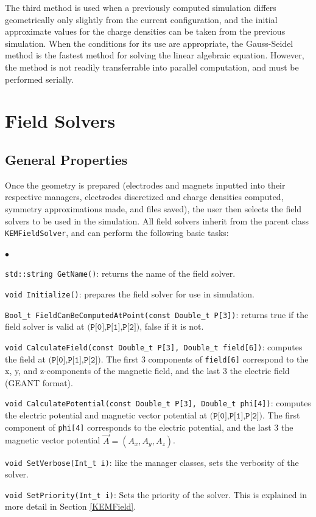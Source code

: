 \documentclass[11pt,a4paper,oneside]{article}
\newcommand{\squishlist}{
   \begin{list}{$\bullet$}
    { \setlength{\itemsep}{0pt}      \setlength{\parsep}{3pt}
      \setlength{\topsep}{3pt}       \setlength{\partopsep}{0pt}
      \setlength{\leftmargin}{1.5em} \setlength{\labelwidth}{1em}
      \setlength{\labelsep}{0.5em} } }
\newcommand{\squishend}{
    \end{list}  }
\begin{document}
The third method is used when a previously computed simulation differs geometrically only slightly from the current configuration, and the initial approximate values for the charge densities can be taken from the previous simulation.  When the conditions for its use are appropriate, the Gauss-Seidel method is the fastest method for solving the linear algebraic equation.  However, the method is not readily transferrable into parallel computation, and must be performed serially.  

\section{Field Solvers}
\label{sec:fieldSolvers}

\subsection{General Properties}
\label{subsec:generalProperties}

Once the geometry is prepared (electrodes and magnets inputted into their respective managers, electrodes discretized and charge densities computed, symmetry approximations made, and files saved), the user then selects the field solvers to be used in the simulation.  All field solvers inherit from the parent class \texttt{KEMFieldSolver}, and can perform the following basic tasks: 
%
\squishlist
\item \texttt{std::string GetName()}: returns the name of the field solver.
\item \texttt{void Initialize()}: prepares the field solver for use in simulation.  
\item \texttt{Bool\_t FieldCanBeComputedAtPoint(const Double\_t P[3])}: returns true if the field solver is valid at $\texttt{(P[0],P[1],P[2])}$, false if it is not.  
\item \texttt{void CalculateField(const Double\_t P[3], Double\_t field[6])}: computes the field at $\texttt{(P[0],P[1],P[2])}$.  The first 3 components of \texttt{field[6]} correspond to the x, y, and z-components of the magnetic field, and the last 3 the electric field (GEANT format).  
\item \texttt{void CalculatePotential(const Double\_t P[3], Double\_t phi[4])}: computes the electric potential and magnetic vector potential at $\texttt{(P[0],P[1],P[2])}$.  The first component of \texttt{phi[4]} corresponds to the electric potential, and the last 3 the magnetic vector potential $\vec{A} = (A_{x},A_{y},A_{z})$.  
\item \texttt{void SetVerbose(Int\_t i)}: like the manager classes, sets the verbosity of the solver.  
\item \texttt{void SetPriority(Int\_t i)}: Sets the priority of the solver.  This is explained in more detail in Section \ref{KEMField}.  
\squishend
%
\end{document}

